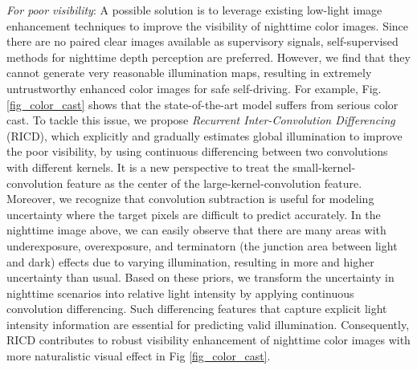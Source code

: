 \documentclass[lettersize,journal]{IEEEtran}
\begin{document}

\emph{For poor visibility}: A possible solution is to leverage existing low-light image enhancement techniques \cite{guo2020zero,ma2022toward,zhang2023fast} to improve the visibility of nighttime color images. Since there are no paired clear images available as supervisory signals, self-supervised methods \cite{guo2020zero,li2021learning,ma2022toward} for nighttime depth perception are preferred. However, we find that they cannot generate very reasonable illumination maps, resulting in extremely untrustworthy enhanced color images for safe self-driving. For example, Fig.\ref{fig_color_cast} shows that the state-of-the-art model \cite{ma2022toward} suffers from serious color cast. To tackle this issue, we propose \emph{Recurrent Inter-Convolution Differencing} (RICD), which explicitly and gradually estimates global illumination to improve the poor visibility, by using continuous differencing between two convolutions with different kernels. It is a new perspective to treat the small-kernel-convolution feature as the center of the large-kernel-convolution feature. Moreover, we recognize that convolution subtraction \cite{shi2022symmetric} is useful for modeling uncertainty \cite{kendall2017uncertainties} where the target pixels are difficult to predict accurately. In the nighttime image above, we can easily observe that there are many areas with underexposure, overexposure, and terminatorn (the junction area between light and dark) effects due to varying illumination, resulting in more and higher uncertainty than usual. Based on these priors, we transform the uncertainty in nighttime scenarios into relative light intensity by applying continuous convolution differencing. Such differencing features that capture explicit light intensity information are essential for predicting valid illumination. Consequently, RICD contributes to robust visibility enhancement of nighttime color images with more naturalistic visual effect in Fig \ref{fig_color_cast}. 
\end{document}
